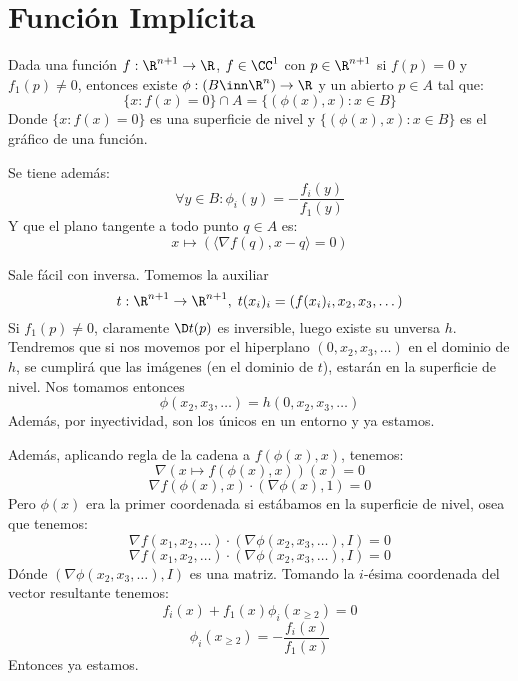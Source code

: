 \documentclass{article}
\begin{document}
    \section*{Función Implícita}
    \begin{teo}
        Dada una función $f : \R^{n+1} \to \R$, $f \in \CC^1$ con $p \in \R^{n+1}$ si $f(p) = 0$ y $f_1(p) \neq 0$, entonces existe $\phi : (B \inn \R^n) \to \R$ y un abierto $p \in A$ tal que:
    \[
        \{x : f(x) = 0\} \cap A = \{(\phi(x), x) : x \in B\}
    \]
    Donde $\{x : f(x) = 0\}$ es una superficie de nivel y $\{(\phi(x), x) : x \in B\}$ es el gráfico de una función.

    Se tiene además:
    \[
        \forall y \in B : \phi_i(y) = -\frac{f_i(y)}{f_1(y)}
    \]
    Y que el plano tangente a todo punto $q \in A$ es:
    \[
        x \mapsto (\langle \nabla f(q), x - q \rangle = 0)
    \]
    \end{teo}
    \begin{demo}
        Sale fácil con inversa. Tomemos la auxiliar
        \[t : \R^{n+1} \to \R^{n+1}, \; t(x_i)_i = (f(x_i)_i, x_2, x_3, \dots)\]
        Si $f_1(p) \neq 0$, claramente $\D t(p)$ es inversible, luego existe su unversa $h$. Tendremos que si nos movemos por el hiperplano $(0, x_2, x_3, \dots)$ en el dominio de $h$, se cumplirá que las imágenes (en el dominio de $t$), estarán en la superficie de nivel. Nos tomamos entonces
        \[\phi(x_2,x_3,\dots) = h(0,x_2,x_3,\dots)\]
        Además, por inyectividad, son los únicos en un entorno y ya estamos.

        Además, aplicando regla de la cadena a $f(\phi(x), x)$, tenemos:
        \[\nabla (x \mapsto f(\phi(x), x))(x) = 0\]
        \[\nabla f(\phi(x), x) \cdot (\nabla \phi(x), 1) = 0\]
        Pero $\phi(x)$ era la primer coordenada si estábamos en la superficie de nivel, osea que tenemos:
        \[\nabla f(x_1,x_2,\dots) \cdot (\nabla \phi(x_2,x_3,\dots), I) = 0\]
        \[\nabla f(x_1,x_2,\dots) \cdot (\nabla \phi(x_2,x_3,\dots), I) = 0\]
        Dónde $(\nabla \phi(x_2,x_3,\dots), I)$ es una matriz. Tomando la $i$-ésima coordenada del vector resultante tenemos:
        \[f_i(x) + f_1(x)\phi_i(x_{\geq 2}) = 0\]
        \[\phi_i(x_{\geq 2}) = -\frac{f_i(x)}{f_1(x)}\]
        Entonces ya estamos.
    \end{demo}
\end{document}
